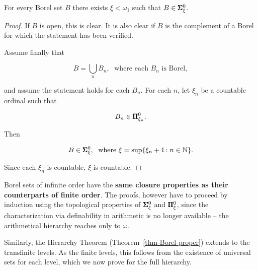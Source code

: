 \begin{proposition}\label{prop-borel-omega1}For every Borel set $B$ there exists $\xi < \omega_1$ such that $B \in \pmb{\Sigma}^0_{\xi}$.

\end{proposition}\begin{proof}If $B$ is open, this is clear. It is also clear if $B$ is the complement of a Borel for which the statement has been verified.

Assume finally that

\begin{equation}
B = \bigcup_n B_n, \; \text{ where each $B_n$ is Borel},
\end{equation}

and assume the statement holds for each $B_n$. For each $n$, let $\xi_n$ be a countable ordinal such that

\begin{equation}
B_n \in \pmb{\Pi}^0_{\xi_n}.
\end{equation}

Then

\begin{equation}
B \in \pmb{\Sigma}^0_{\xi}, \; \text{ where $\xi = \sup \{\xi_n +1 \colon n \in \mathbb{N}\}$}.
\end{equation}

Since each $\xi_n$ is countable, $\xi$ is countable.

\end{proof}Borel sets of infinite order have the \textbf{same closure properties as their counterparts of finite order}. The proofs, however have to proceed by induction using the topological properties of $\pmb{\Sigma}^0_{\xi}$ and $\pmb{\Pi}^0_{\xi}$, since the characterization via definability in arithmetic is no longer available -- the arithmetical hierarchy reaches only to $\omega$.

Similarly, the Hierarchy Theorem (Theorem~\ref{thm-Borel-proper}) extends to the transfinite levels. As the finite levels, this follows from the existence of universal sets for each level, which we now prove for the full hierarchy.

